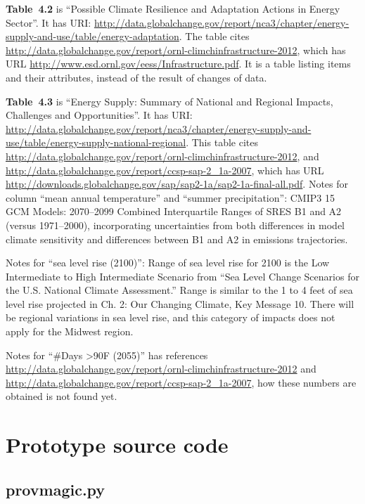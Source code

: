 \mbox{}

\textbf{Table~4.2} is ``Possible Climate Resilience and Adaptation Actions in Energy Sector''. It has URI: \url{http://data.globalchange.gov/report/nca3/chapter/energy-supply-and-use/table/energy-adaptation}.
The table cites \url{http://data.globalchange.gov/report/ornl-climchinfrastructure-2012}, which has URL \url{http://www.esd.ornl.gov/eess/Infrastructure.pdf}.
It is a table listing items and their attributes, instead of the result of changes of data.

\textbf{Table~4.3} is ``Energy Supply: Summary of National and Regional Impacts, Challenges and Opportunities''. It has
URI: \url{http://data.globalchange.gov/report/nca3/chapter/energy-supply-and-use/table/energy-supply-national-regional}.
This table cites \url{http://data.globalchange.gov/report/ornl-climchinfrastructure-2012}, and \url{http://data.globalchange.gov/report/ccsp-sap-2_1a-2007}, which has URL \url{http://downloads.globalchange.gov/sap/sap2-1a/sap2-1a-final-all.pdf}.
Notes for column ``mean annual temperature'' and ``summer precipitation'': CMIP3 15 GCM Models: 2070--2099 Combined Interquartile Ranges of SRES B1 and A2 (versus 1971--2000), incorporating uncertainties from both differences in model climate sensitivity and differences between B1 and A2 in emissions trajectories.

Notes for ``sea level rise (2100)'': Range of sea level rise for 2100 is the Low Intermediate to High Intermediate Scenario from ``Sea Level Change Scenarios for the U.S. National Climate Assessment.'' Range is similar to the 1 to 4 feet of sea level rise projected in Ch. 2: Our Changing Climate, Key Message 10. There will be regional variations in sea level rise, and this category of impacts does not apply for the Midwest region.

Notes for ``\#Days >90F (2055)'' has references \url{http://data.globalchange.gov/report/ornl-climchinfrastructure-2012} and \url{http://data.globalchange.gov/report/ccsp-sap-2_1a-2007}, how these numbers are obtained is not found yet.

\chapter{Prototype source code}
\section{provmagic.py}

